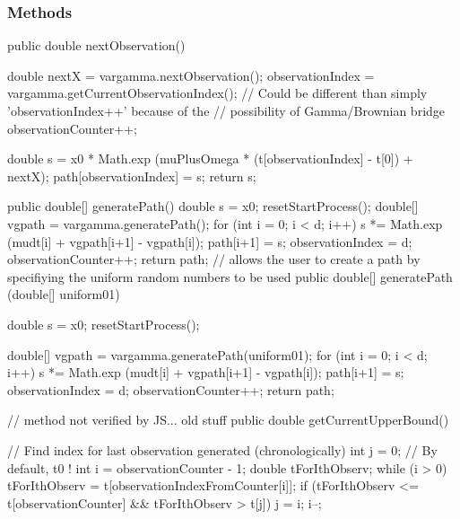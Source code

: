 \subsubsection* {Methods}
\begin{hide}\begin{code}

   public double nextObservation() {
        double nextX  = vargamma.nextObservation();
        observationIndex = vargamma.getCurrentObservationIndex();
        // Could be different than simply 'observationIndex++' because of the
        // possibility of Gamma/Brownian bridge
        observationCounter++;

        double s = x0 * Math.exp (muPlusOmega * (t[observationIndex] - t[0])
                                  + nextX);
        path[observationIndex] = s;
        return s;
    }

   public double[] generatePath() {
        double s = x0;
        resetStartProcess();
        double[] vgpath = vargamma.generatePath();
        for (int i = 0; i < d; i++) {
            s *= Math.exp (mudt[i] + vgpath[i+1] - vgpath[i]);
            path[i+1] = s;
        }
        observationIndex = d;
        observationCounter++;
        return path;
    }
    // allows the user to create a path by specifiying the uniform random numbers to be used
   public double[] generatePath (double[] uniform01) {
        double s = x0;
        resetStartProcess();

        double[] vgpath = vargamma.generatePath(uniform01);
        for (int i = 0; i < d; i++) {
            s *= Math.exp (mudt[i] + vgpath[i+1] - vgpath[i]);
            path[i+1] = s;
        }
        observationIndex = d;
        observationCounter++;
        return path;
    }


    // method not verified by JS...  old stuff
   public double getCurrentUpperBound()  {
        // Find index for last observation generated (chronologically)
        int j = 0; // By default, t0 !
        int i = observationCounter - 1;
        double tForIthObserv;
        while (i > 0) {
            tForIthObserv = t[observationIndexFromCounter[i]];
            if (tForIthObserv <= t[observationCounter] && tForIthObserv > t[j])
                j = i;
            i--;
        }

}
\end{code}
\end{hide}

